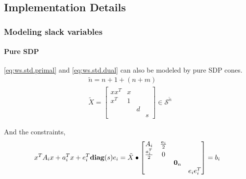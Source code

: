 \documentclass[../main]{subfiles}
\begin{document}
\subsection{Implementation Details}
\subsubsection{Modeling slack variables}
\paragraph{Pure SDP}
\eqref{eq:ws.std.primal} and \eqref{eq:ws.std.dual} can also be modeled by pure SDP cones.
\begin{equation}
    \begin{aligned}
         & \tilde n = n + 1 + (n + m)                                       \\
         & \tilde{X} = \begin{bmatrix}
            xx^T & x &   &   \\
            x^T  & 1 &   &   \\
                 &   & d &   \\
                 &   &   & s
        \end{bmatrix}\in \mathscr S^{\tilde{n}}
    \end{aligned}
\end{equation}

And the constraints,
\begin{equation}
    x^TA_ix + a_i^Tx + e_i^T\mathbf{diag}(s)e_i = \tilde{X} \bullet    \begin{bmatrix}
        A_i             & \frac{a_i}{2} &         &          \\
        \frac{a_i^T}{2} & 0             &         &          \\
                        &               & \bm 0_n &          \\
                        &               &         & e_ie_i^T
    \end{bmatrix} = b_i
\end{equation}
\end{document}
